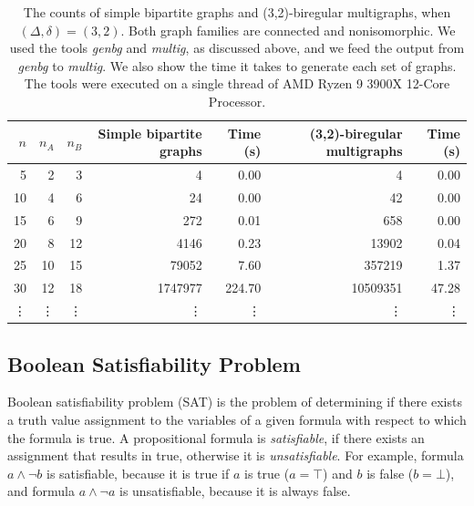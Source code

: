 \begin{table}[H]
  \centering
  \begin{adjustbox}{width={\textwidth},keepaspectratio}%
  \begin{tabular}{r|rr|rr|rr}
    \toprule
    $n$& $n_A$ & $n_B$ & Simple bipartite graphs & Time (s) & (3,2)-biregular multigraphs  & Time (s)\\
    \midrule
    5   & 2 & 3   & 4  & 0.00    & 4     & 0.00\\
    10  & 4 & 6   & 24  & 0.00   & 42    & 0.00\\
    15  & 6 & 9   & 272  & 0.01  & 658   & 0.00\\
    20  & 8 & 12  & 4146 & 0.23  & 13902 & 0.04\\
    25  & 10 & 15 & 79052 & 7.60 & 357219& 1.37\\
    30  & 12 & 18 & 1747977 & 224.70 & 10509351& 47.28\\
    \vdots & \vdots &\vdots&\vdots&\vdots&\vdots&\vdots\\
    \bottomrule
  \end{tabular}
  \end{adjustbox}
  \caption{%
    The counts of simple bipartite graphs and (3,2)-biregular multigraphs, when $(\Delta, \delta) = (3, 2)$.
    Both graph families are connected and nonisomorphic.
    We used the tools \emph{genbg} and \emph{multig}, as discussed above, and we feed the output from \emph{genbg} to \emph{multig}.
    We also show the time it takes to generate each set of graphs.
    The tools were executed on a single thread of AMD Ryzen 9 3900X 12-Core Processor.
  }
  \label{tbl:graph_count_nonisomorphicasdasd}
\end{table}

\subsection{Boolean Satisfiability Problem} \label{sec:implementation:sat}

Boolean satisfiability problem (SAT) is the problem of determining if there exists a truth value assignment to the variables of a given formula with respect to which the formula is true.
A propositional formula is \emph{satisfiable}, if there exists an assignment that results in true, otherwise it is \emph{unsatisfiable}.
For example, formula $a \land \neg b$ is satisfiable, because it is true if $a$ is true ($a=\top$) and $b$ is false ($b=\bot$), and formula $a \land \neg a$ is unsatisfiable, because it is always false.

